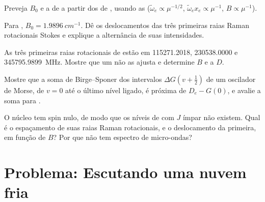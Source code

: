 \begin{exercise}[$\star\star$]\label{exo:b3:rovibrational-spectroscopy:8}
Preveja $B_0$ e a  de  a partir dos de , usando
as  ($\tilde\omega_e \propto \mu^{-1/2}$, $\tilde\omega_ex_e \propto
\mu^{-1}$, $B \propto \mu^{-1}$).
\end{exercise}

\begin{exercise}[$\star\star$]\label{exo:b3:rovibrational-spectroscopy:9}
Para , $B_0 = \qty{1.9896}{cm^{-1}}$. Dê os deslocamentos das três primeiras
raias Raman rotacionais Stokes e explique a alternância de suas
intensidades.
\end{exercise}

\begin{exercise}[$\star\star\star$]\label{exo:b3:rovibrational-spectroscopy:10}
As três primeiras raias rotacionais de  estão em 115271.2018,
230538.0000 e \qty{345795.9899}{MHz}. Mostre que um  não as ajusta e
determine $B$ e a  $D$.
\end{exercise}

\begin{exercise}[$\star\star\star$]\label{exo:b3:rovibrational-spectroscopy:11}
Mostre que a soma de Birge--Sponer dos intervalos $\Delta G(v + \frac12)$ de um
oscilador de Morse, de $v = 0$ até o último nível ligado, é próxima de $D_e - G(0)$, e
avalie a soma para .
\end{exercise}

\begin{exercise}[$\star\star\star$]\label{exo:b3:rovibrational-spectroscopy:12}
O núcleo  tem spin nulo, de modo que os níveis de 
com $J$ ímpar não existem. Qual é o espaçamento de suas raias Raman rotacionais, e o
deslocamento da primeira, em função de $B$? Por que  não tem espectro de
micro-ondas?
\end{exercise}

\section{Problema: Escutando uma nuvem fria}

